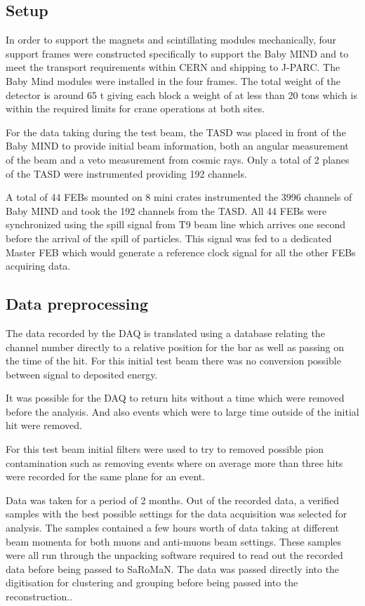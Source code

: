 \subsection{Setup}

In order to support the magnets and scintillating modules mechanically, four support frames were constructed specifically to support the Baby MIND and  to meet the transport requirements within CERN and shipping to J-PARC. The Baby Mind modules were installed in the four frames. The total weight of the detector is around 65 t giving each block a weight of at less than 20 tons which is within the required limits for crane operations at both sites.

For the data taking during the test beam, the TASD was placed in front of the Baby MIND to provide initial beam information, both an angular measurement of the beam and a veto measurement from cosmic rays. Only a total of 2 planes of the TASD were instrumented providing 192 channels. 

A total of 44 FEBs mounted on 8 mini crates instrumented the 3996 channels of Baby MIND and took the 192 channels from the TASD. All 44 FEBs were synchronized using the spill signal from T9 beam line which arrives one second before the arrival of the spill of particles. This signal was fed to a dedicated Master FEB which would generate a reference clock signal for all the other FEBs acquiring data.

\subsection{Data preprocessing}
The data recorded by the DAQ is translated using a database relating the channel number directly to a relative position for the bar as well as passing on the time of the hit. For this initial test beam there was no conversion possible between signal to deposited energy.

It was possible for the DAQ to return hits without a time which were removed before the analysis. And also events which were to large time outside of the initial hit were removed.

For this test beam initial filters were used to try to removed possible pion contamination such as removing events where on average more than three hits were recorded for the same plane for an event. 

Data was taken for a period of 2 months. Out of the recorded data, a verified samples with the best possible settings for the data acquisition was selected for analysis. The samples contained a few hours worth of data taking at different beam momenta for both muons and anti-muons beam settings. These samples were all run through the unpacking software required to read out the recorded data before being passed to SaRoMaN. The data was passed directly into the digitisation for clustering and grouping before being passed into the reconstruction..

